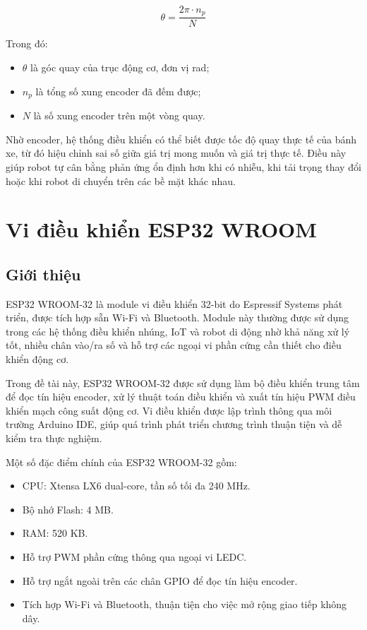 \begin{equation}
    \theta = \frac{2\pi \cdot n_p}{N}
\end{equation}

Trong đó:
\begin{itemize}
    \item $\theta$ là góc quay của trục động cơ, đơn vị rad;
    \item $n_p$ là tổng số xung encoder đã đếm được;
    \item $N$ là số xung encoder trên một vòng quay.
\end{itemize}


Nhờ encoder, hệ thống điều khiển có thể biết được tốc độ quay thực tế của bánh xe, từ đó hiệu chỉnh sai số giữa giá trị mong muốn và giá trị thực tế. Điều này giúp robot tự cân bằng phản ứng ổn định hơn khi có nhiễu, khi tải trọng thay đổi hoặc khi robot di chuyển trên các bề mặt khác nhau.


\section{Vi điều khiển ESP32 WROOM}

\subsection{Giới thiệu}

ESP32 WROOM-32 là module vi điều khiển 32-bit do Espressif Systems phát triển, được tích hợp sẵn Wi-Fi và Bluetooth. Module này thường được sử dụng trong các hệ thống điều khiển nhúng, IoT và robot di động nhờ khả năng xử lý tốt, nhiều chân vào/ra số và hỗ trợ các ngoại vi phần cứng cần thiết cho điều khiển động cơ.

Trong đề tài này, ESP32 WROOM-32 được sử dụng làm bộ điều khiển trung tâm để đọc tín hiệu encoder, xử lý thuật toán điều khiển và xuất tín hiệu PWM điều khiển mạch công suất động cơ. Vi điều khiển được lập trình thông qua môi trường Arduino IDE, giúp quá trình phát triển chương trình thuận tiện và dễ kiểm tra thực nghiệm.

Một số đặc điểm chính của ESP32 WROOM-32 gồm:

\begin{itemize}
    \item CPU: Xtensa LX6 dual-core, tần số tối đa 240 MHz.
    \item Bộ nhớ Flash: 4 MB.
    \item RAM: 520 KB.
    \item Hỗ trợ PWM phần cứng thông qua ngoại vi LEDC.
    \item Hỗ trợ ngắt ngoài trên các chân GPIO để đọc tín hiệu encoder.
    \item Tích hợp Wi-Fi và Bluetooth, thuận tiện cho việc mở rộng giao tiếp không dây.
\end{itemize}

